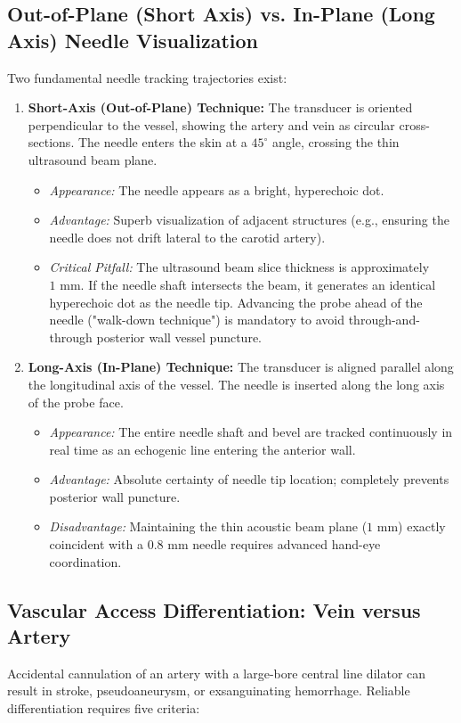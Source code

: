 \documentclass[11pt,a4paper]{article}
\begin{document}
\subsection{Out-of-Plane (Short Axis) vs. In-Plane (Long Axis) Needle Visualization}
Two fundamental needle tracking trajectories exist:
\begin{enumerate}[leftmargin=2em]
    \item \textbf{Short-Axis (Out-of-Plane) Technique:}
    The transducer is oriented perpendicular to the vessel, showing the artery and vein as circular cross-sections. The needle enters the skin at a $45^\circ$ angle, crossing the thin ultrasound beam plane.
    \begin{itemize}
        \item \textit{Appearance:} The needle appears as a bright, hyperechoic dot.
        \item \textit{Advantage:} Superb visualization of adjacent structures (e.g., ensuring the needle does not drift lateral to the carotid artery).
        \item \textit{Critical Pitfall:} The ultrasound beam slice thickness is approximately $1\text{ mm}$. If the needle shaft intersects the beam, it generates an identical hyperechoic dot as the needle tip. Advancing the probe ahead of the needle ("walk-down technique") is mandatory to avoid through-and-through posterior wall vessel puncture.
    \end{itemize}
    \item \textbf{Long-Axis (In-Plane) Technique:}
    The transducer is aligned parallel along the longitudinal axis of the vessel. The needle is inserted along the long axis of the probe face.
    \begin{itemize}
        \item \textit{Appearance:} The entire needle shaft and bevel are tracked continuously in real time as an echogenic line entering the anterior wall.
        \item \textit{Advantage:} Absolute certainty of needle tip location; completely prevents posterior wall puncture.
        \item \textit{Disadvantage:} Maintaining the thin acoustic beam plane ($1\text{ mm}$) exactly coincident with a $0.8\text{ mm}$ needle requires advanced hand-eye coordination.
    \end{itemize}
\end{enumerate}

\subsection{Vascular Access Differentiation: Vein versus Artery}
Accidental cannulation of an artery with a large-bore central line dilator can result in stroke, pseudoaneurysm, or exsanguinating hemorrhage. Reliable differentiation requires five criteria:
\end{document}
